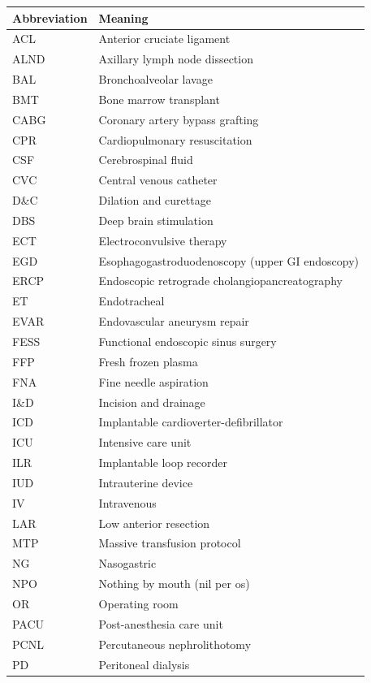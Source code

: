 \documentclass[12pt,oneside]{book}
\begin{document}
\begin{footnotesize}
\begin{longtable}{@{}ll@{}}
\toprule
\textbf{Abbreviation} & \textbf{Meaning} \\
\midrule
\endhead
ACL & Anterior cruciate ligament \\
ALND & Axillary lymph node dissection \\
BAL & Bronchoalveolar lavage \\
BMT & Bone marrow transplant \\
CABG & Coronary artery bypass grafting \\
CPR & Cardiopulmonary resuscitation \\
CSF & Cerebrospinal fluid \\
CVC & Central venous catheter \\
D\&C & Dilation and curettage \\
DBS & Deep brain stimulation \\
ECT & Electroconvulsive therapy \\
EGD & Esophagogastroduodenoscopy (upper GI endoscopy) \\
ERCP & Endoscopic retrograde cholangiopancreatography \\
ET & Endotracheal \\
EVAR & Endovascular aneurysm repair \\
FESS & Functional endoscopic sinus surgery \\
FFP & Fresh frozen plasma \\
FNA & Fine needle aspiration \\
I\&D & Incision and drainage \\
ICD & Implantable cardioverter-defibrillator \\
ICU & Intensive care unit \\
ILR & Implantable loop recorder \\
IUD & Intrauterine device \\
IV & Intravenous \\
LAR & Low anterior resection \\
MTP & Massive transfusion protocol \\
NG & Nasogastric \\
NPO & Nothing by mouth (nil per os) \\
OR & Operating room \\
PACU & Post-anesthesia care unit \\
PCNL & Percutaneous nephrolithotomy \\
PD & Peritoneal dialysis \\

\end{longtable}
\end{footnotesize}
\end{document}
